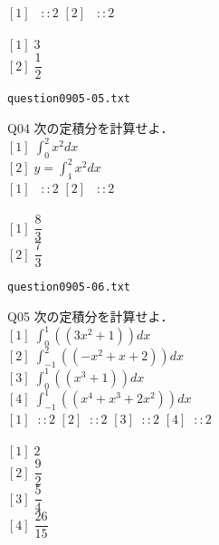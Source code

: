 \documentclass[10pt,dvipdfmx]{ujarticle}
\begin{document}
$[1]\;\;\;::2$ 
$[2]\;\;\;::2$ 
\\
\\
$[1]\;3$\\
$[2]\;\dfrac{1}{2}$\\
\newpage
\begin{center}
\verb|question0905-05.txt|\\
\end{center}
Q04 
$\text{次の定積分を計算せよ．}$\\
$[1]\;\displaystyle\int_{0}^{2} x^2 dx $\\
$[2]\;y=\displaystyle\int_{1}^{2} x^2 dx $\\
$[1]\;\;\;::2$ 
$[2]\;\;\;::2$ 
\\
\\
$[1]\;\dfrac{8}{3}$\\
$[2]\;\dfrac{7}{3}$\\
\newpage
\begin{center}
\verb|question0905-06.txt|\\
\end{center}
Q05 
$\text{次の定積分を計算せよ．}$\\
$[1]\;\displaystyle\int_{0}^{1} ((3x^2+1)) dx $\\
$[2]\;\displaystyle\int_{-1}^{2} ((-x^2+x+2)) dx $\\
$[3]\;\displaystyle\int_{0}^{1} ((x^3+1)) dx $\\
$[4]\;\displaystyle\int_{-1}^{1} ((x^4+x^3+2x^2)) dx $\\
$[1]\;\;::2$ 
$[2]\;\;::2$ 
$[3]\;\;::2$ 
$[4]\;\;::2$ 
\\
\\
$[1]\;2$\\
$[2]\;\dfrac{9}{2}$\\
$[3]\;\dfrac{5}{4}$\\
$[4]\;\dfrac{26}{15}$\\
\newpage
\end{document}
